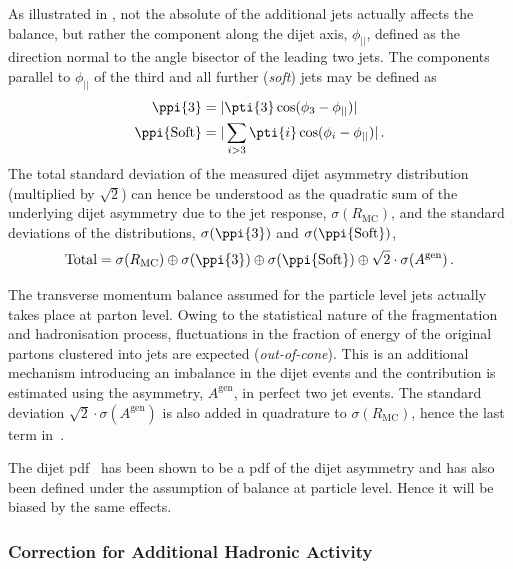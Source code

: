 As illustrated in , not the
absolute \pt of the additional jets actually affects the balance, but rather the component along the dijet axis, $\phi_{||}$, defined as the direction normal to the angle bisector of the leading two jets.
The \pt components parallel to $\phi_{||}$ of the third and all further
(\textit{soft}) jets may be defined as
\begin{align}
  \begin{split}
    \ppi{3}               & =  |\pti{3}\cos(\phi_{3}-\phi_{||})| \\
    \ppi{\text{Soft}} & =  |\sum_{i>3}\pti{i}\cos(\phi_{i}-\phi_{||})| \,.
  \end{split}
\end{align}
The total standard deviation of the measured dijet asymmetry
distribution (multiplied by $\sqrt{2}$) can hence be understood as the
quadratic sum of the underlying dijet asymmetry due to the jet \pt response,
$\sigma(R_{\text{MC}})$, and the standard deviations of the \pp
distributions, $\sigma(\ppi{3})$ and
$\sigma(\ppi{\text{Soft}})$,
\begin{equation}
  \label{eq:ResFit:TotalAsym}
  \text{Total} = \sigma(R_{\text{MC}}) \oplus \sigma(\ppi{3}) \oplus
  \sigma(\ppi{\text{Soft}}) \oplus \sqrt{2}\cdot\sigma(A^{\text{gen}}) \,.
\end{equation}

The transverse momentum balance assumed for the particle level jets
actually takes place at parton level.
Owing to the statistical nature of the fragmentation and hadronisation
process, fluctuations in the
fraction of energy of the original partons clustered into jets are
expected (\textit{out-of-cone}).
This is an additional mechanism introducing an imbalance in the
dijet events and the contribution is estimated using the \ptgen
asymmetry, $A^{\text{gen}}$, in perfect
two jet events.
The standard deviation $\sqrt{2}\cdot\sigma(A^{\text{gen}})$ is also added in quadrature to
$\sigma(R_{\text{MC}})$, hence the last term in~.

The dijet pdf~ has been shown to be a pdf of
the dijet asymmetry and has also been defined under the assumption of \pt
balance at particle level.
Hence it will be biased by the same effects.



\subsubsection{Correction for Additional Hadronic Activity}\label{sec:ResFit:DataDriven:AddJets:Extrapolation}

